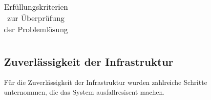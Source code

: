 \begin{table}[h]
\begin{tabular}{ | p{} | p{5cm} | p{5cm} | p{} |}
	
\end{tabular}
\caption{Erfüllungskriterien zur Überprüfung der Problemlösung}
\label{tab:kriterien}

\end{table}
\subsection{Zuverlässigkeit der Infrastruktur}
Für die Zuverlässigkeit der Infrastruktur wurden zahlreiche Schritte unternommen, die das System ausfallresisent machen. %

